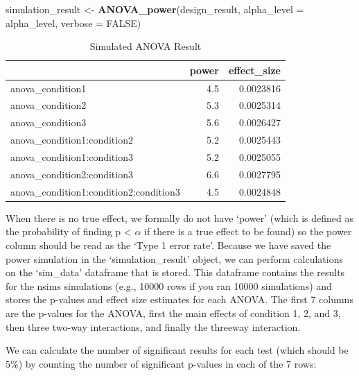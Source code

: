 \documentclass[]{book}
\newenvironment{Shaded}{\begin{snugshade}}{\end{snugshade}}
\newcommand{\DataTypeTok}[1]{\textcolor[rgb]{0.13,0.29,0.53}{#1}}
\newcommand{\KeywordTok}[1]{\textcolor[rgb]{0.13,0.29,0.53}{\textbf{#1}}}
\newcommand{\NormalTok}[1]{#1}
\newcommand{\OtherTok}[1]{\textcolor[rgb]{0.56,0.35,0.01}{#1}}
\newcommand{\StringTok}[1]{\textcolor[rgb]{0.31,0.60,0.02}{#1}}
\begin{document}
\begin{Shaded}
\begin{Highlighting}[]
\NormalTok{simulation_result <-}\StringTok{ }\KeywordTok{ANOVA_power}\NormalTok{(design_result,}
                                 \DataTypeTok{alpha_level =}\NormalTok{ alpha_level,}
                                 \DataTypeTok{verbose =} \OtherTok{FALSE}\NormalTok{)}
\end{Highlighting}
\end{Shaded}

\begin{table}[!h]

\caption{\label{tab:unnamed-chunk-269}Simulated ANOVA Result}
\centering
\begin{tabular}{l|r|r}
\hline
  & power & effect\_size\\
\hline
anova\_condition1 & 4.5 & 0.0023816\\
\hline
anova\_condition2 & 5.3 & 0.0025314\\
\hline
anova\_condition3 & 5.6 & 0.0026427\\
\hline
anova\_condition1:condition2 & 5.2 & 0.0025443\\
\hline
anova\_condition1:condition3 & 5.2 & 0.0025055\\
\hline
anova\_condition2:condition3 & 6.6 & 0.0027795\\
\hline
anova\_condition1:condition2:condition3 & 4.5 & 0.0024848\\
\hline
\end{tabular}
\end{table}

When there is no true effect, we formally do not have `power' (which is defined as the probability of finding p \textless{} \(\alpha\) if there is a true effect to be found) so the power column should be read as the `Type 1 error rate'. Because we have saved the power simulation in the `simulation\_result' object, we can perform calculations on the `sim\_data' dataframe that is stored. This dataframe contains the results for the nsims simulations (e.g., 10000 rows if you ran 10000 simulations) and stores the p-values and effect size estimates for each ANOVA. The first 7 columns are the p-values for the ANOVA, first the main effects of condition 1, 2, and 3, then three two-way interactions, and finally the threeway interaction.

We can calculate the number of significant results for each test (which should be 5\%) by counting the number of significant p-values in each of the 7 rows:
\end{document}
